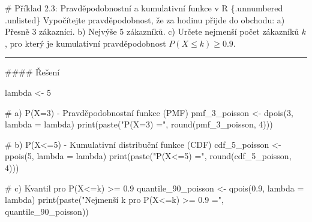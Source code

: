 \documentclass[
  czech,
  11pt,
  letterpaper,
  DIV=11,
  numbers=noendperiod]{scrreprt}
\newenvironment{Shaded}{\begin{snugshade}}{\end{snugshade}}
\newcommand{\AttributeTok}[1]{\textcolor[rgb]{0.40,0.45,0.13}{#1}}
\newcommand{\CommentTok}[1]{\textcolor[rgb]{0.37,0.37,0.37}{#1}}
\newcommand{\DecValTok}[1]{\textcolor[rgb]{0.68,0.00,0.00}{#1}}
\newcommand{\FloatTok}[1]{\textcolor[rgb]{0.68,0.00,0.00}{#1}}
\newcommand{\FunctionTok}[1]{\textcolor[rgb]{0.28,0.35,0.67}{#1}}
\newcommand{\NormalTok}[1]{\textcolor[rgb]{0.00,0.23,0.31}{#1}}
\newcommand{\OtherTok}[1]{\textcolor[rgb]{0.00,0.23,0.31}{#1}}
\newcommand{\StringTok}[1]{\textcolor[rgb]{0.13,0.47,0.30}{#1}}
\begin{document}
\begin{tcolorbox}[enhanced jigsaw, arc=.35mm, bottomrule=.15mm, bottomtitle=1mm, breakable, colback=white, colbacktitle=quarto-callout-note-color!10!white, colframe=quarto-callout-note-color-frame, coltitle=black, left=2mm, leftrule=.75mm, opacityback=0, opacitybacktitle=0.6, rightrule=.15mm, title=\textcolor{quarto-callout-note-color}{\faInfo}\hspace{0.5em}{Poznámka}, titlerule=0mm, toprule=.15mm, toptitle=1mm]

\# Příklad 2.3: Pravděpodobnostní a kumulativní funkce v R \{.unnumbered
.unlisted\} Vypočítejte pravděpodobnost, že za hodinu přijde do obchodu:
a) Přesně 3 zákazníci. b) Nejvýše 5 zákazníků. c) Určete nejmenší počet
zákazníků \(k\), pro který je kumulativní pravděpodobnost
\(P(X \le k) \ge 0.9\).

\begin{center}\rule{0.5\linewidth}{0.5pt}\end{center}

\#\#\#\# Řešení

\begin{Shaded}
\begin{Highlighting}[]
\NormalTok{lambda }\OtherTok{\textless{}{-}} \DecValTok{5}

\CommentTok{\# a) P(X=3) {-} Pravděpodobnostní funkce (PMF)}
\NormalTok{pmf\_3\_poisson }\OtherTok{\textless{}{-}} \FunctionTok{dpois}\NormalTok{(}\DecValTok{3}\NormalTok{, }\AttributeTok{lambda =}\NormalTok{ lambda)}
\FunctionTok{print}\NormalTok{(}\FunctionTok{paste}\NormalTok{(}\StringTok{"P(X=3) ="}\NormalTok{, }\FunctionTok{round}\NormalTok{(pmf\_3\_poisson, }\DecValTok{4}\NormalTok{)))}

\CommentTok{\# b) P(X\textless{}=5) {-} Kumulativní distribuční funkce (CDF)}
\NormalTok{cdf\_5\_poisson }\OtherTok{\textless{}{-}} \FunctionTok{ppois}\NormalTok{(}\DecValTok{5}\NormalTok{, }\AttributeTok{lambda =}\NormalTok{ lambda)}
\FunctionTok{print}\NormalTok{(}\FunctionTok{paste}\NormalTok{(}\StringTok{"P(X\textless{}=5) ="}\NormalTok{, }\FunctionTok{round}\NormalTok{(cdf\_5\_poisson, }\DecValTok{4}\NormalTok{)))}

\CommentTok{\# c) Kvantil pro P(X\textless{}=k) \textgreater{}= 0.9}
\NormalTok{quantile\_90\_poisson }\OtherTok{\textless{}{-}} \FunctionTok{qpois}\NormalTok{(}\FloatTok{0.9}\NormalTok{, }\AttributeTok{lambda =}\NormalTok{ lambda)}
\FunctionTok{print}\NormalTok{(}\FunctionTok{paste}\NormalTok{(}\StringTok{"Nejmenší k pro P(X\textless{}=k) \textgreater{}= 0.9 ="}\NormalTok{, quantile\_90\_poisson))}
\end{Highlighting}
\end{Shaded}

\end{tcolorbox}
\end{document}
